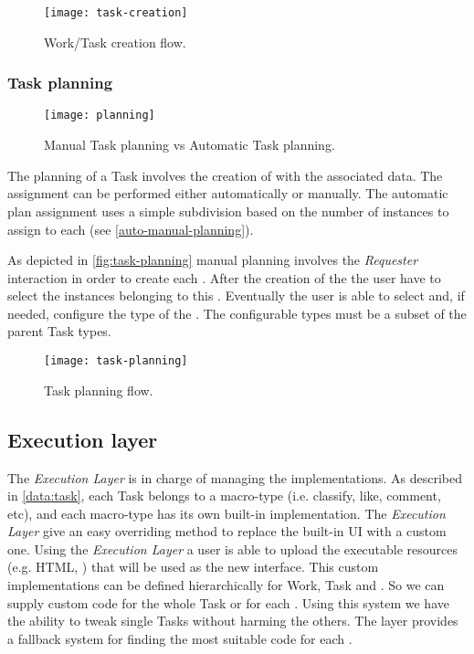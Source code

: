 \begin{figure}[htb]
    \centering
    \texttt{[image: task-creation]}
    \caption{Work/Task creation flow.}
    \label{fig:task-creation}
\end{figure}



\subsubsection{Task planning}
\begin{figure}[htb]
    \centering
    \texttt{[image: planning]}
    \caption{Manual Task planning vs Automatic Task planning.}
    \label{fig:auto-manual-planning}
\end{figure}
The planning of a Task involves the creation of \utask{} with the associated data.
The assignment can be performed either automatically or manually.
The automatic plan assignment uses a simple subdivision based on the
number of instances to assign to each \utask{} (see \autoref{auto-manual-planning}).

As depicted in \autoref{fig:task-planning} manual planning involves the
\emph{Requester} interaction in order to create each \textbf{\utask{}}.
After the creation of the \utask{} the user have to select the instances belonging
to this \utask{}. Eventually the user is able to select and, if needed,
configure the type of the \utask{}. The configurable types must be a subset of
the parent Task types.
\begin{figure}[htb]
    \centering
    \texttt{[image: task-planning]}
    \caption{Task planning flow.}
    \label{fig:task-planning}
\end{figure}










\subsection{Execution layer}\label{sec:exec-layer}
The \emph{Execution Layer} is in charge of managing the \utask{} implementations.
As described in \ref{data:task}, each Task belongs to a macro-type (i.e.
classify, like, comment, etc), and each macro-type  has its own built-in
implementation. The \emph{Execution Layer} give an easy overriding method to
replace the built-in UI with a custom one.
Using the \emph{Execution Layer} a user is able to upload the executable resources
(e.g. HTML, \js{}) that will be used as the new interface.
This custom implementations can be defined hierarchically for Work, Task
and \utask{}. So we can supply custom code for the whole Task or
for each \utask{}. Using this system we have the ability to tweak single
Tasks without harming the others. The layer provides a fallback
system for finding the most suitable code for each \utask{}.

